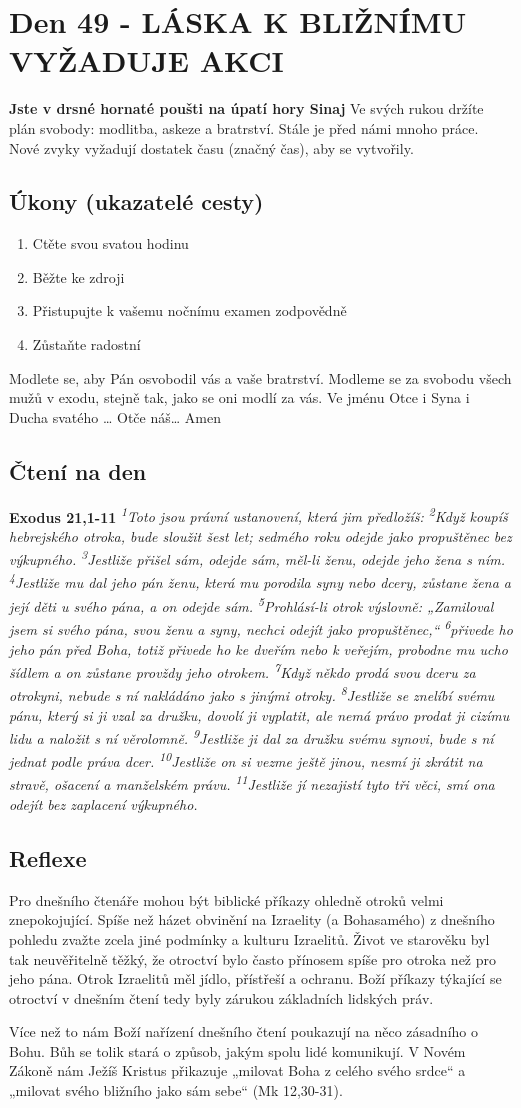 \documentclass[11pt]{article}
\newcommand{\zacatekSedmyTyden}{
  \textbf{Jste v drsné hornaté poušti na úpatí hory Sinaj} \newline 
  Ve svých rukou držíte plán svobody: modlitba, askeze a bratrství. Stále je před námi mnoho práce. Nové zvyky vyžadují dostatek času (značný čas), aby se vytvořily.

  \subsection*{Úkony (ukazatelé cesty)}
\begin{enumerate}
  \item Ctěte svou svatou hodinu
  \item Běžte ke zdroji
  \item Přistupujte k vašemu nočnímu examen zodpovědně
  \item Zůstaňte radostní
\end{enumerate}
Modlete se, aby Pán osvobodil vás a vaše bratrství. \newline
Modleme se za svobodu všech mužů v exodu, stejně tak, jako se oni modlí za vás.\newline
Ve jménu Otce i Syna i Ducha svatého …  Otče náš… Amen
}
\begin{document}
\newpage
\section{Den 49 - LÁSKA K BLIŽNÍMU VYŽADUJE AKCI}
\zacatekSedmyTyden
\subsection*{Čtení na den}
\textbf{Exodus 21,1-11}
\newline
\textit{
\textsuperscript{1}Toto jsou právní ustanovení, která jim předložíš:
\textsuperscript{2}Když koupíš hebrejského otroka, bude sloužit šest let; sedmého roku odejde jako propuštěnec bez výkupného.
\textsuperscript{3}Jestliže přišel sám, odejde sám, měl-li ženu, odejde jeho žena s ním.
\textsuperscript{4}Jestliže mu dal jeho pán ženu, která mu porodila syny nebo dcery, zůstane žena a její děti u svého pána, a on odejde sám.
\textsuperscript{5}Prohlásí-li otrok výslovně: „Zamiloval jsem si svého pána, svou ženu a syny, nechci odejít jako propuštěnec,“
\textsuperscript{6}přivede ho jeho pán před Boha, totiž přivede ho ke dveřím nebo k veřejím, probodne mu ucho šídlem a on zůstane provždy jeho otrokem.
\textsuperscript{7}Když někdo prodá svou dceru za otrokyni, nebude s ní nakládáno jako s jinými otroky.
\textsuperscript{8}Jestliže se znelíbí svému pánu, který si ji vzal za družku, dovolí ji vyplatit, ale nemá právo prodat ji cizímu lidu a naložit s ní věrolomně.
\textsuperscript{9}Jestliže ji dal za družku svému synovi, bude s ní jednat podle práva dcer.
\textsuperscript{10}Jestliže on si vezme ještě jinou, nesmí ji zkrátit na stravě, ošacení a manželském právu.
\textsuperscript{11}Jestliže jí nezajistí tyto tři věci, smí ona odejít bez zaplacení výkupného.
}

\subsection*{Reflexe}
Pro dnešního čtenáře mohou být biblické příkazy ohledně otroků velmi znepokojující. Spíše než házet obvinění na
Izraelity (a Bohasamého) z dnešního pohledu zvažte zcela jiné podmínky a kulturu Izraelitů. Život ve starověku byl tak
neuvěřitelně těžký, že otroctví bylo často přínosem spíše pro otroka než pro jeho pána. Otrok Izraelitů měl jídlo, přístřeší
a ochranu. Boží příkazy týkající se otroctví v dnešním čtení tedy byly zárukou základních lidských práv.

Více než to nám Boží nařízení dnešního čtení poukazují na něco zásadního o Bohu. Bůh se tolik stará o způsob, jakým
spolu lidé komunikují. V Novém Zákoně nám Ježíš Kristus přikazuje „milovat Boha z celého svého srdce“ a „milovat
svého bližního jako sám sebe“ (Mk 12,30-31).
\end{document}
